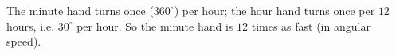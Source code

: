 The minute hand turns once ($360^\circ$) per hour; the hour hand turns once per $12$ hours, i.e. $30^\circ$ per hour. So the minute hand is $\boxed{12}$ times as fast (in angular speed).

